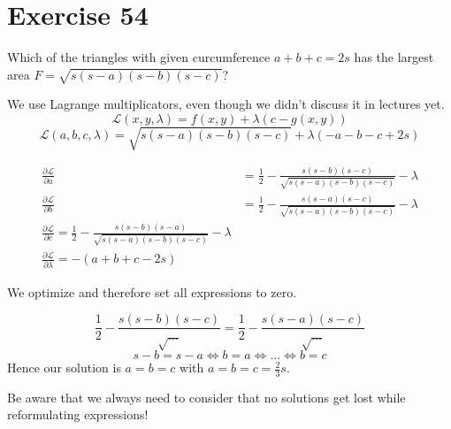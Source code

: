 \documentclass[a4paper]{article}
\theoremstyle{definition}
\begin{document}
\section{Exercise 54}
\begin{ex}
  Which of the triangles with given curcumference $a + b + c = 2s$ has the largest area
  $F = \sqrt{s (s - a) (s - b) (s - c)}$?
\end{ex}

We use Lagrange multiplicators, even though we didn't discuss it in lectures yet.
\[ \mathcal{L}(x,y,\lambda) = f(x,y) + \lambda (c - g(x,y)) \]
\[ \mathcal{L}(a,b,c,\lambda) = \sqrt{s (s-a) (s-b) (s-c)} + \lambda (-a - b - c + 2s) \]

\begin{align*}
  \frac{\partial \mathcal{L}}{\partial a} &= \frac12 - \frac{s (s-b) (s-c)}{\sqrt{s (s-a) (s-b) (s-c)}} - \lambda \\
  \frac{\partial \mathcal{L}}{\partial b} &= \frac{1}{2} - \frac{s (s-a) (s-c)}{\sqrt{s (s-a) (s-b) (s-c)}} - \lambda \\
  \frac{\partial \mathcal{L}}{\partial c}  = \frac12 - \frac{s (s-b) (s-a)}{\sqrt{s (s-a) (s-b) (s-c)}} - \lambda \\
  \frac{\partial \mathcal{L}}{\partial \lambda} = -(a + b + c - 2s)
\end{align*}

We optimize and therefore set all expressions to zero.

\[ \frac12 - \frac{s (s-b) (s-c)}{\sqrt{\ldots}} = \frac12 - \frac{s (s-a) (s-c)}{\sqrt{\ldots}} \]
\[ s - b = s - a \iff b = a \iff \ldots \iff b = c \]
Hence our solution is $a = b = c$ with $a = b = c = \frac23s$.

Be aware that we always need to consider that no solutions get lost while reformulating expressions!
\end{document}
